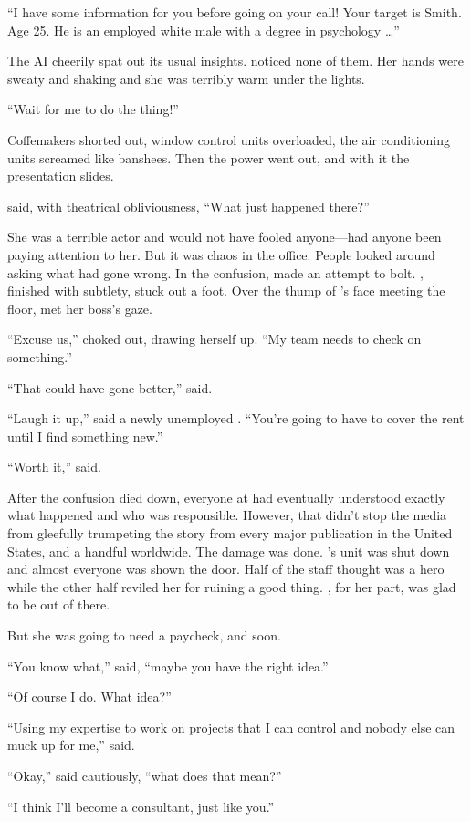 ``I have some information for you before going on your call! Your target is \energyJerk{} Smith. Age 25. He is an employed white male with a degree in psychology \dots''

The AI cheerily spat out its usual insights. {\protag} noticed none of them. Her hands were sweaty and shaking and she was terribly warm under the lights.

``Wait for me to do the thing!''

Coffemakers shorted out, window control units overloaded, the air conditioning units screamed like banshees. Then the power went out, and with it the presentation slides.

{\protag} said, with theatrical obliviousness, ``What just happened there?''

She was a terrible actor and would not have fooled anyone---had anyone been paying attention to her. But it was chaos in the office. People looked around asking what had gone wrong. In the confusion, \energyJerk{} made an attempt to bolt. {\protag}, finished with subtlety, stuck out a foot. Over the thump of \energyJerk{}'s face meeting the floor, {\protag} met her boss's gaze.

``Excuse us,'' \Boss{} choked out, drawing herself up. ``My team needs to check on something.''

\sectionBreak{}

``That could have gone better,'' {\sidetag} said.

``Laugh it up,'' said a newly unemployed {\protag}. ``You're going to have to cover the rent until I find something new.''

``Worth it,'' {\sidetag} said.

After the confusion died down, everyone at \energyCompany{} had eventually understood exactly what happened and who was responsible. However, that didn't stop the media from gleefully trumpeting the story from every major publication in the United States, and a handful worldwide. The damage was done. {\protag}'s unit was shut down and almost everyone was shown the door. Half of the staff thought {\protag} was a hero while the other half reviled her for ruining a good thing. {\protag}, for her part, was glad to be out of there.

But she was going to need a paycheck, and soon.

``You know what,'' {\protag} said, ``maybe you have the right idea.''

``Of course I do. What idea?''

``Using my expertise to work on projects that I can control and nobody else can muck up for me,'' {\protag} said.

``Okay,'' {\sidetag} said cautiously, ``what does that mean?''

``I think I'll become a consultant, just like you.''
